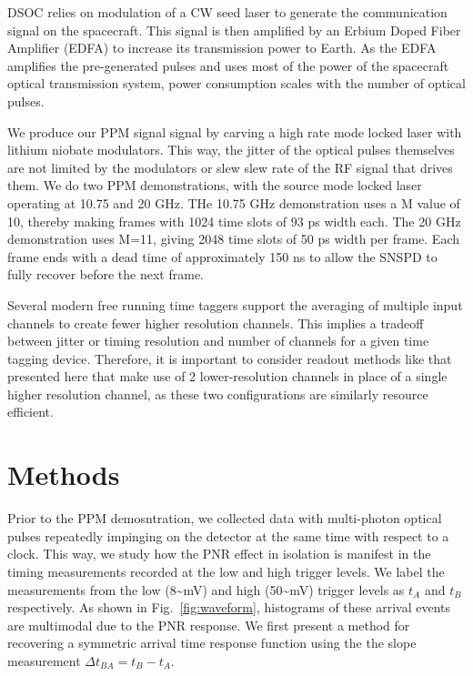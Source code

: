 \documentclass[11pt]{caltech_thesis} %
\begin{document}
DSOC relies on modulation of a CW seed laser to generate the
communication signal on the spacecraft. This signal is then amplified by
an Erbium Doped Fiber Amplifier (EDFA) to increase its transmission
power to Earth. As the EDFA amplifies the pre-generated pulses and uses
most of the power of the spacecraft optical transmission system, power
consumption scales with the number of optical pulses.

We produce our PPM signal signal by carving a high rate mode locked
laser with lithium niobate modulators. This way, the jitter of the
optical pulses themselves are not limited by the modulators or slew slew
rate of the RF signal that drives them. We do two PPM demonstrations,
with the source mode locked laser operating at 10.75 and 20 GHz. THe
10.75 GHz demonstration uses a M value of 10, thereby making frames with
1024 time slots of 93 ps width each. The 20 GHz demonstration uses M=11,
giving 2048 time slots of 50 ps width per frame. Each frame ends with a
dead time of approximately 150 ns to allow the SNSPD to fully recover
before the next frame.

Several modern free running time taggers support the averaging of
multiple input channels to create fewer higher resolution channels. This
implies a tradeoff between jitter or timing resolution and number of
channels for a given time tagging device. Therefore, it is important to
consider readout methods like that presented here that make use of 2
lower-resolution channels in place of a single higher resolution
channel, as these two configurations are similarly resource efficient.

\hypertarget{methods}{%
\section{Methods}\label{methods}}

Prior to the PPM demosntration, we collected data with multi-photon
optical pulses repeatedly impinging on the detector at the same time
with respect to a clock. This way, we study how the PNR effect in
isolation is manifest in the timing measurements recorded at the low and
high trigger levels. We label the measurements from the low
(8\textasciitilde mV) and high (50\textasciitilde mV) trigger levels as
$t_A$ and $t_B$ respectively. As shown in Fig.~\ref{fig:waveform},
histograms of these arrival events are multimodal due to the PNR
response. We first present a method for recovering a symmetric arrival
time response function using the the slope measurement
$\Delta t_{BA} = t_B - t_A$.
\end{document}
